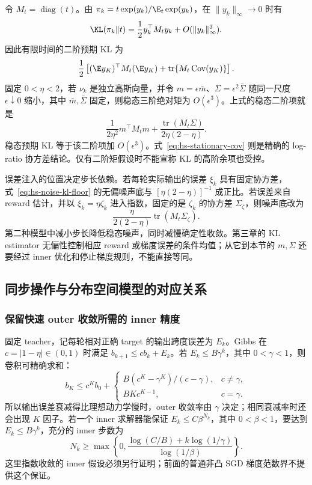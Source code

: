 令 $M_t=\operatorname{diag}(t)$。由 $\pi_k=t\exp(y_k)/\E_t\exp(y_k)$，在 $\|y_k\|_\infty\to0$ 时有
\[
 \KL(\pi_k\Vert t)=\frac12 y_k^\top M_t y_k
                   +O(\|y_k\|_\infty^3).
\]
因此有限时间的二阶预期 KL 为
\[
 \frac12\left[(\E y_K)^\top M_t(\E y_K)
             +\operatorname{tr}\{M_t\operatorname{Cov}(y_K)\}\right].
\]
固定 $0<\eta<2$，若 $\nu_k$ 是独立高斯向量，并令 $m=\epsilon\bar m$、$\Sigma=\epsilon^2\bar\Sigma$ 随同一尺度 $\epsilon\downarrow0$ 缩小，其中 $\bar m,\bar\Sigma$ 固定，则稳态三阶绝对矩为 $O(\epsilon^3)$。上式的稳态二阶项就是
\begin{equation}\label{eq:hs-noise-kl-floor}
 \frac{1}{2\eta^2}m^\top M_tm
 +\frac{\operatorname{tr}(M_t\Sigma)}{2\eta(2-\eta)}.
\end{equation}
稳态预期 KL 等于该二阶项加 $O(\epsilon^3)$。式~\eqref{eq:hs-stationary-cov} 则是精确的 log-ratio 协方差结论。仅有二阶矩假设时不能宣称 KL 的高阶余项也受控。

误差注入的位置决定步长依赖。若每轮实际输出的误差 $\xi_k$ 具有固定协方差，式~\eqref{eq:hs-noise-kl-floor} 的无偏噪声底与 $[\eta(2-\eta)]^{-1}$ 成正比。若误差来自 reward 估计，并以 $\xi_k=\eta\zeta_k$ 进入指数，固定的是 $\zeta_k$ 的协方差 $\Sigma_\zeta$，则噪声底改为
\[
 \frac{\eta}{2(2-\eta)}\operatorname{tr}(M_t\Sigma_\zeta).
\]
第二种模型中减小步长降低稳态噪声，同时减慢确定性收敛。第三章的 KL estimator 无偏性控制相应 reward 或梯度误差的条件均值；从它到本节的 $m,\Sigma$ 还要经过 inner 优化和停止梯度规则，不能直接等同。

\subsection{同步操作与分布空间模型的对应关系}

\subsubsection{保留快速 outer 收敛所需的 inner 精度}

固定 teacher，记每轮相对正确 target 的输出跨度误差为 $E_k$。Gibbs 在 $c=|1-\eta|\in(0,1)$ 时满足 $b_{k+1}\le cb_k+E_k$。若 $E_k\le B\gamma^k$，其中 $0<\gamma<1$，则卷积可精确求和：
\[
 b_K\le c^Kb_0+
 \begin{cases}
 B(c^K-\gamma^K)/(c-\gamma),&c\ne\gamma,\\
 BKc^{K-1},&c=\gamma.
 \end{cases}
\]
所以输出误差衰减得比理想动力学慢时，outer 收敛率由 $\gamma$ 决定；相同衰减率时还会出现 $K$ 因子。若一个 inner 求解器能保证 $E_k\le C\beta^{N_k}$，其中 $0<\beta<1$，要达到 $E_k\le B\gamma^k$，充分的 inner 步数为
\[
 N_k\ge\max\left\{0,
 \frac{\log(C/B)+k\log(1/\gamma)}{\log(1/\beta)}\right\}.
\]
这里指数收敛的 inner 假设必须另行证明；前面的普通非凸 SGD 梯度范数界不提供这个保证。


